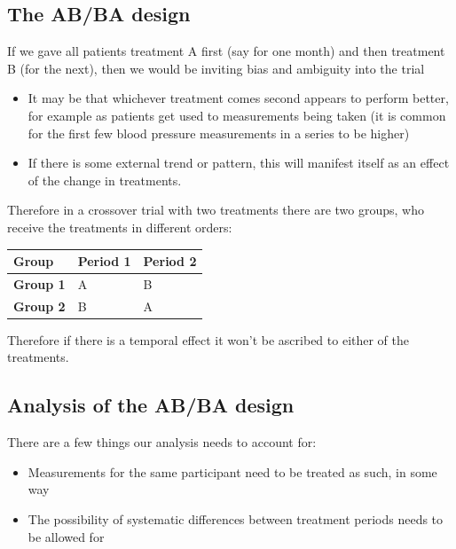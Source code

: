 \documentclass[
  openany]{book}
\providecommand{\tightlist}{%
  \setlength{\itemsep}{0pt}\setlength{\parskip}{0pt}}
\theoremstyle{definition}
\theoremstyle{definition}
\theoremstyle{definition}
\theoremstyle{definition}
\theoremstyle{remark}
\begin{document}
\hypertarget{the-abba-design}{%
\subsection{The AB/BA design}\label{the-abba-design}}

If we gave all patients treatment A first (say for one month) and then treatment B (for the next), then we would be inviting bias and ambiguity into the trial

\begin{itemize}
\tightlist
\item
  It may be that whichever treatment comes second appears to perform better, for example as patients get used to measurements being taken (it is common for the first few blood pressure measurements in a series to be higher)
\item
  If there is some external trend or pattern, this will manifest itself as an effect of the change in treatments.
\end{itemize}

Therefore in a crossover trial with two treatments there are two groups, who receive the treatments in different orders:

\begin{longtable}[]{@{}lll@{}}
\toprule\noalign{}
Group & Period 1 & Period 2 \\
\midrule\noalign{}
\endhead
\bottomrule\noalign{}
\endlastfoot
\textbf{Group 1} & A & B \\
\textbf{Group 2} & B & A \\
\end{longtable}

Therefore if there is a temporal effect it won't be ascribed to either of the treatments.

\hypertarget{analysis-of-the-abba-design}{%
\subsection{Analysis of the AB/BA design}\label{analysis-of-the-abba-design}}

There are a few things our analysis needs to account for:

\begin{itemize}
\tightlist
\item
  Measurements for the same participant need to be treated as such, in some way
\item
  The possibility of systematic differences between treatment periods needs to be allowed for
\end{itemize}
\end{document}
